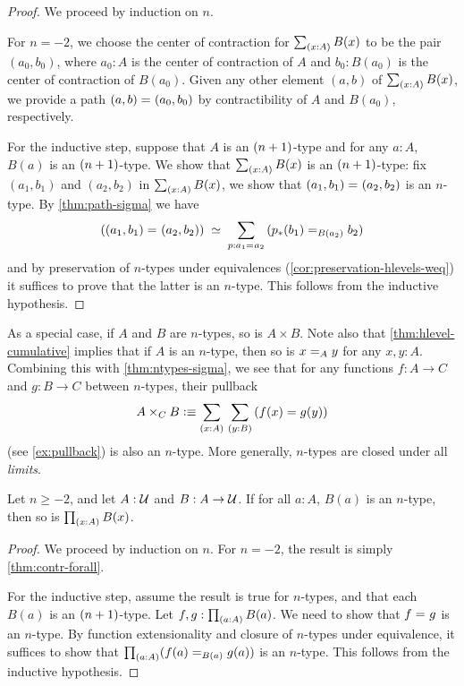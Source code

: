 \begin{proof}
 We proceed by induction on $n$.

 For $n = -2$, we choose the center of contraction for $\sm{x : A} B(x)$ to be the pair
       $(a_0, b_0)$, where $a_0 : A$ is the center of contraction of $A$ and $b_0 : B(a_0)$ is the center of contraction of $B(a_0)$.
       Given any other element $(a,b)$ of $\sm{x : A} B(x)$, we provide a path $\id{(a, b)}{(a_0,b_0)}$
       by contractibility of $A$ and $B(a_0)$, respectively.

 For the inductive step, suppose that $A$ is an $\nplusone$-type and
         for any $a : A$, $B(a)$ is an $\nplusone$-type. We show that $\sm{x : A} B(x)$ is an $\nplusone$-type:
      fix $(a_1, b_1)$ and $(a_2,b_2)$ in $\sm{x : A} B(x)$,
     we show that $\id{(a_1, b_1)}{(a_2,b_2)}$ is an $n$-type.
      By \cref{thm:path-sigma} we have
      \[ \eqvspaced{(\id{(a_1, b_1)}{(a_2,b_2)})}{\sm{p : \id{a_1}{a_2}} (\id[B(a_2)]{\trans{p}{b_1}}{b_2})} \]
   and by preservation of $n$-types under equivalences (\cref{cor:preservation-hlevels-weq})
   it suffices to prove that the latter is an $n$-type. This follows from the
   inductive hypothesis.
\end{proof}

As a special case, if $A$ and $B$ are $n$-types, so is $A\times B$.
Note also that \cref{thm:hlevel-cumulative} implies that if $A$ is an $n$-type, then so is $\id[A]xy$ for any $x,y:A$.
Combining this with \cref{thm:ntypes-sigma}, we see that for any functions $f:A\to C$ and $g:B\to C$ between $n$-types, their pullback
\[ A\times_C B \defeq \sm{x:A}{y:B} (f(x)=g(y)) \]
(see \cref{ex:pullback}) is also an $n$-type.
More generally, $n$-types are closed under all \emph{limits}.

\begin{thm}\label{thm:hlevel-prod}
 Let $n\geq -2$, and let $A : \type$ and $B : A \to \type$.
 If for all $a : A$, $B(a)$ is an $n$-type, then so is $\prd{x : A} B(x)$.
\end{thm}

\begin{proof}
  We proceed by induction on $n$.
  For $n = -2$, the result is simply \cref{thm:contr-forall}.

  For the inductive step, assume the result is true for $n$-types, and that each $B(a)$ is an $\nplusone$-type.
  Let $f, g : \prd{a:A}B(a)$.
  We need to show that $\id{f}{g}$ is an $n$-type.
  By function extensionality and closure of $n$-types under equivalence, it suffices to show that $\prd{a : A} (\id[B(a)]{f(a)}{g(a)})$ is an $n$-type.
  This follows from the inductive hypothesis.
\end{proof}

